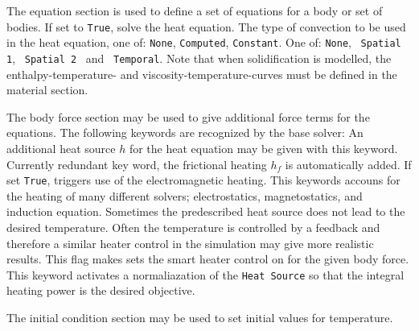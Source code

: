 The equation section is used to define a set of equations for a body or set of bodies.
\sifbegin
{} If set to {\tt True}, solve the heat equation.
The type of convection to be used
in the heat equation, one of: {\tt None}, {\tt Computed}, {\tt Constant}.
One of: {\tt None},~ {\tt Spatial 1},
~{\tt Spatial 2}~ and~ {\tt Temporal}.
Note that when solidification is modelled, the
enthalpy-temperature- and viscosity-temperature-curves must be defined in 
the material section.
\sifend


The body force section may be used to give additional force terms for the equations.
The following keywords are recognized by the base solver:
\sifbegin
{}
An additional heat source $h$ for the heat equation may be given
with this keyword.
Currently redundant key word, the frictional heating $h_f$ is automatically
added.
If set {\tt True}, triggers use of the electromagnetic heating. 
This keywords accouns for the heating of many different solvers; electrostatics,
magnetostatics, and induction equation.
%
Sometimes the predescribed heat source does not lead to the desired 
temperature. Often the temperature is controlled by a feedback and therefore
a similar heater control in the simulation may give more realistic results.
This flag makes sets the smart heater control on for the given body force.
%
This keyword activates a normaliazation of the \texttt{Heat Source} so that the 
integral heating power is the desired objective. 
\sifend


The initial condition section may be used to set initial values for temperature.
\sifbegin
{}
\sifend

